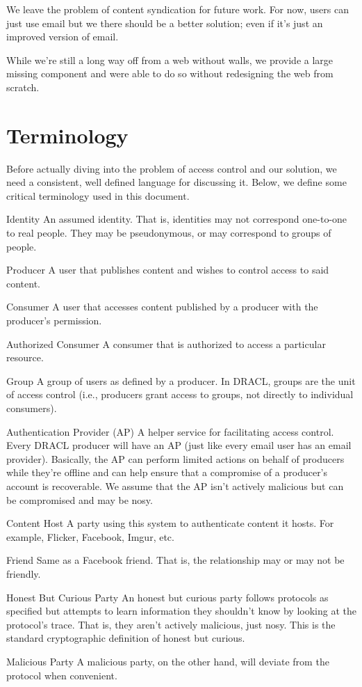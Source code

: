 \documentclass[pdftex,12pt,a4papaer,twoside,notitlepage]{report}
\begin{document}
We leave the problem of content syndication for future work. For now, users can
just use email but we there should be a better solution; even if it's just an
improved version of email.

While we're still a long way off from a web without walls, we provide a large
missing component and were able to do so without redesigning the web from
scratch.

\section{Terminology}

Before actually diving into the problem of access control and our solution, we
need a consistent, well defined language for discussing it. Below, we define
some critical terminology used in this document.

\begin{compactdesc}
    \item[Identity] An assumed identity. That is, identities may not correspond
      one-to-one to real people. They may be pseudonymous, or may correspond to
      groups of people.
    \item[Producer] A user that publishes content and wishes to control
      access to said content.
    \item[Consumer] A user that accesses content published by a producer
      with the producer's permission.
    \item[Authorized Consumer] A consumer that is authorized to access a
      particular resource.
    \item[Group] A group of users as defined by a producer. In DRACL, groups
      are the unit of access control (i.e., producers grant access to groups,
      not directly to individual consumers).
    \item[Authentication Provider (AP)] A helper service for facilitating access
      control. Every DRACL producer will have an AP (just like every email user
      has an email provider). Basically, the AP can perform limited actions on
      behalf of producers while they're offline and can help ensure that a
      compromise of a producer's account is recoverable. We assume that the AP
      isn't actively malicious but can be compromised and may be nosy.
    \item[Content Host] A party using this system to authenticate content it
      hosts. For example, Flicker, Facebook, Imgur, etc.
    \item[Friend] Same as a Facebook friend. That is, the relationship may or
      may not be friendly.
    \item[Honest But Curious Party] An honest but curious party follows
      protocols as specified but attempts to learn information they shouldn't
      know by looking at the protocol's trace. That is, they aren't actively
      malicious, just nosy. This is the standard cryptographic definition of
      honest but curious.
    \item[Malicious Party] A malicious party, on the other hand, will deviate
      from the protocol when convenient.
\end{compactdesc}
\end{document}
